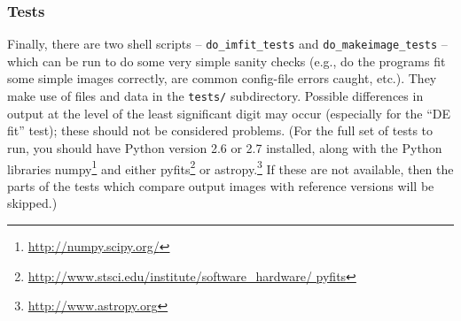 \documentclass[10pt,a4paper,article]{memoir}
\newcommand{\imfit}{\textbf{Imfit}}
\newcommand{\Imfit}{\textbf{Imfit}}
\newcommand{\makeimage}{\texttt{makeimage}}
\begin{document}
%
%

\subsubsection{Tests}

Finally, there are two shell scripts -- \texttt{do\_imfit\_tests} and
\texttt{do\_makeimage\_tests} -- which can be run to do some very simple
sanity checks (e.g., do the programs fit some simple images correctly,
are common config-file errors caught, etc.). They make use of files and
data in the \texttt{tests/} subdirectory. Possible differences in output
at the level of the least significant digit may occur (especially for
the ``DE fit'' test); these should not be considered problems. (For the
full set of tests to run, you should have Python version 2.6 or 2.7
installed, along with the Python libraries numpy\footnote{\url{http://numpy.scipy.org/}}
and either
pyfits\footnote{\url{http://www.stsci.edu/institute/software_hardware/
pyfits}} or astropy.\footnote{\url{http://www.astropy.org}} If these are not available, then the parts of
the tests which compare output images with reference versions will
be skipped.)


%
%
\end{document}
